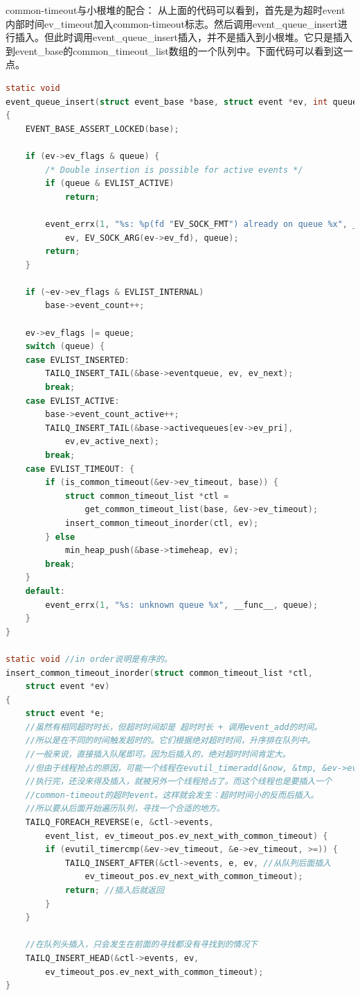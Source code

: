 \documentclass[11pt,a4paper]{article}
\begin{document}
common-timeout与小根堆的配合：
从上面的代码可以看到，首先是为超时event内部时间ev\_timeout加入common-timeout标志。然后调用event\_queue\_insert进行插入。但此时调用event\_queue\_insert插入，并不是插入到小根堆。它只是插入到event\_base的common\_timeout\_list数组的一个队列中。下面代码可以看到这一点。

\begin{lstlisting}[language=C]
static void
event_queue_insert(struct event_base *base, struct event *ev, int queue)
{
	EVENT_BASE_ASSERT_LOCKED(base);

	if (ev->ev_flags & queue) {
		/* Double insertion is possible for active events */
		if (queue & EVLIST_ACTIVE)
			return;

		event_errx(1, "%s: %p(fd "EV_SOCK_FMT") already on queue %x", __func__,
		    ev, EV_SOCK_ARG(ev->ev_fd), queue);
		return;
	}

	if (~ev->ev_flags & EVLIST_INTERNAL)
		base->event_count++;

	ev->ev_flags |= queue;
	switch (queue) {
	case EVLIST_INSERTED:
		TAILQ_INSERT_TAIL(&base->eventqueue, ev, ev_next);
		break;
	case EVLIST_ACTIVE:
		base->event_count_active++;
		TAILQ_INSERT_TAIL(&base->activequeues[ev->ev_pri],
		    ev,ev_active_next);
		break;
	case EVLIST_TIMEOUT: {
		if (is_common_timeout(&ev->ev_timeout, base)) {
			struct common_timeout_list *ctl =
			    get_common_timeout_list(base, &ev->ev_timeout);
			insert_common_timeout_inorder(ctl, ev);
		} else
			min_heap_push(&base->timeheap, ev);
		break;
	}
	default:
		event_errx(1, "%s: unknown queue %x", __func__, queue);
	}
}

static void //in order说明是有序的。
insert_common_timeout_inorder(struct common_timeout_list *ctl,
    struct event *ev)
{
	struct event *e;
	//虽然有相同超时时长，但超时时间却是 超时时长 + 调用event_add的时间。
	//所以是在不同的时间触发超时的。它们根据绝对超时时间，升序排在队列中。
	//一般来说，直接插入队尾即可。因为后插入的，绝对超时时间肯定大。
	//但由于线程抢占的原因，可能一个线程在evutil_timeradd(&now, &tmp, &ev->ev_timeout);
	//执行完，还没来得及插入，就被另外一个线程抢占了。而这个线程也是要插入一个
	//common-timeout的超时event。这样就会发生：超时时间小的反而后插入。
	//所以要从后面开始遍历队列，寻找一个合适的地方。
	TAILQ_FOREACH_REVERSE(e, &ctl->events,
	    event_list, ev_timeout_pos.ev_next_with_common_timeout) {
		if (evutil_timercmp(&ev->ev_timeout, &e->ev_timeout, >=)) {
			TAILQ_INSERT_AFTER(&ctl->events, e, ev, //从队列后面插入
			    ev_timeout_pos.ev_next_with_common_timeout);
			return; //插入后就返回
		}
	}

	//在队列头插入，只会发生在前面的寻找都没有寻找到的情况下
	TAILQ_INSERT_HEAD(&ctl->events, ev,
	    ev_timeout_pos.ev_next_with_common_timeout);
}
\end{lstlisting}
\end{document}
